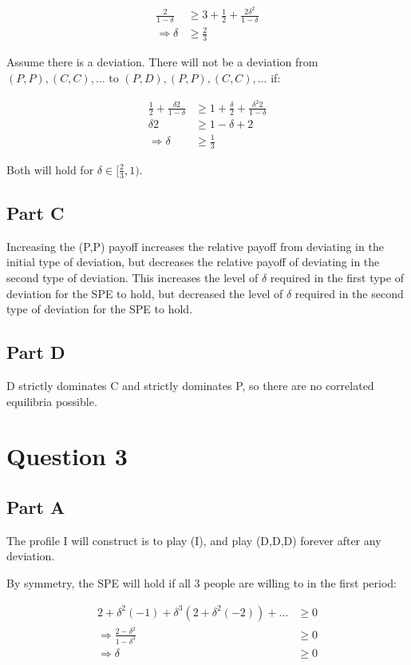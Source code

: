 \documentclass[11pt]{article} %
\begin{document}
\begin{align*}
\frac{2}{1-\delta} &\geq 3 + \frac{1}{2} + \frac{2\delta^2 }{1-\delta}\\
\Rightarrow \delta&\geq \frac{2}{3}
\end{align*}

Assume there is a deviation. There will not be a deviation from $(P,P),(C,C),\dots$ to $(P,D),(P,P),(C,C),\dots$ if:

\begin{align*}
\frac{1}{2} + \frac{\delta 2}{1-\delta} &\geq 1+\frac{\delta}{2}+ \frac{\delta^2 2}{1-\delta}\\
\delta 2 &\geq 1-\delta + 2\\
\Rightarrow  \delta&\geq \frac{1}{3}
\end{align*}

Both will hold for $\delta \in [\frac{2}{3},1)$.

\subsection{Part C}
Increasing the (P,P) payoff increases the relative payoff from deviating in the initial type of deviation, but decreases the relative payoff of deviating in the second type of deviation. This increases the level of $\delta$ required in the first type of deviation for the SPE to hold, but decreased the level of $\delta$ required in the second type of deviation for the SPE to hold.

\subsection{Part D}

D strictly dominates C and strictly dominates P, so there are no correlated equilibria possible.

\section{Question 3}
\subsection{Part A}
The profile I will construct is to play (I), and play (D,D,D) forever after any deviation.

By symmetry, the SPE will hold if all 3 people are willing to in the first period:

\begin{align*}
2  + \delta^2(-1) +\delta^3(2  + \delta^2(-2) ) + \dots &\geq 0\\
\Rightarrow \frac{2-\delta^2}{1-\delta^3} &\geq 0\\
\Rightarrow \delta &\geq 0
\end{align*}
\end{document}

